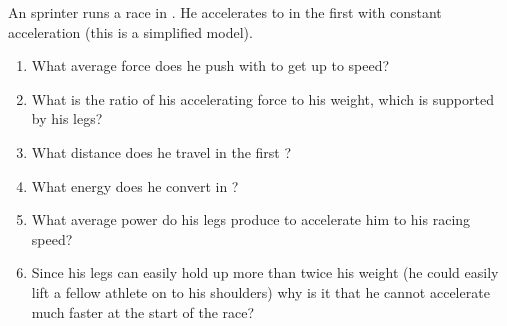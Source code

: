 
\begin{problem}[Robin5]
{An  sprinter runs a  race in . He accelerates to  in the first  with constant acceleration (this is a simplified model).
\begin{enumerate}
	\item What average force does he push with to get up to speed?
	\item What is the ratio of his accelerating force to his weight, which is supported by his legs?
	\item What distance does he travel in the first ?
	\item What energy does he convert in ?
	\item What average power do his legs produce to accelerate him to his racing speed?
	\item Since his legs can easily hold up more than twice his weight (he could easily lift a fellow athlete on to his shoulders) why is it that he cannot accelerate much faster at the start of the race?
\end{enumerate}
}
{}
{}
\end{problem}